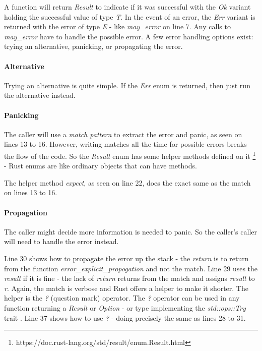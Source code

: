 A function will return \textit{Result} to indicate if it was successful with the \textit{Ok} variant holding the successful value of type \textit{T}.
In the event of an error, the \textit{Err} variant is returned with the error of type \textit{E} - like \textit{may\_error} on line 7.
Any calls to \textit{may\_error} have to handle the possible error.
A few error handling options exist: trying an alternative, panicking, or propagating the error.

\paragraph{Alternative}
Trying an alternative is quite simple.
If the \textit{Err} enum is returned, then just run the alternative instead.

\paragraph{Panicking}
The caller will use a \textit{match pattern} to extract the error and panic, as seen on lines 13 to 16.
However, writing matches all the time for possible errors breaks the flow of the code.
So the \textit{Result} enum has some helper methods defined on it \footnote{https://doc.rust-lang.org/std/result/enum.Result.html} - Rust enums are like ordinary objects that can have methods.

The helper method \textit{expect}, as seen on line 22, does the exact same as the match on lines 13 to 16.

\paragraph{Propagation}
The caller might decide more information is needed to panic.
So the caller's caller will need to handle the error instead.

Line 30 shows how to propagate the error up the stack - the \textit{return} is to return from the function \textit{error\_explicit\_propogation} and not the match.
Line 29 uses the \textit{result} if it is fine - the lack of \textit{return} returns from the match and assigns \textit{result} to \textit{r}.
Again, the match is verbose and Rust offers a helper to make it shorter.
The helper is the \textit{?} (question mark) operator.
The \textit{?} operator can be used in any function returning a \textit{Result} or \textit{Option} - or type implementing the \textit{std::ops::Try} trait \cite{klabnik_2019_01}.
Line 37 shows how to use \textit{?} - doing precisely the same as lines 28 to 31.


